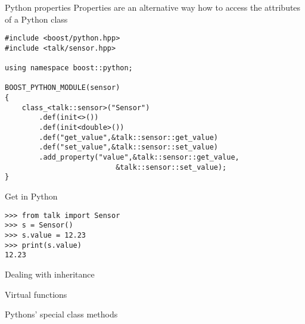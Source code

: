 \begin{frame}[fragile]{Python properties}
    Properties are an alternative way how to access the attributes of a Python
    class 
    \vspace{0.02\textheight}
    \begin{verbatim}
#include <boost/python.hpp>
#include <talk/sensor.hpp>

using namespace boost::python;

BOOST_PYTHON_MODULE(sensor)
{
    class_<talk::sensor>("Sensor")
        .def(init<>())
        .def(init<double>())
        .def("get_value",&talk::sensor::get_value)
        .def("set_value",&talk::sensor::set_value)
        .add_property("value",&talk::sensor::get_value,
                          &talk::sensor::set_value); 
}
    \end{verbatim}
    \vspace{0.03\textheight}
    Get in Python
    \vspace{0.02\textheight}
    \begin{verbatim}
>>> from talk import Sensor
>>> s = Sensor()
>>> s.value = 12.23
>>> print(s.value)
12.23
    \end{verbatim}
\end{frame}

\begin{frame}[fragile]{Dealing with inheritance}
\end{frame}

\begin{frame}[fragile]{Virtual functions}
\end{frame}

\begin{frame}[fragile]{Pythons' special class methods}
\end{frame}



